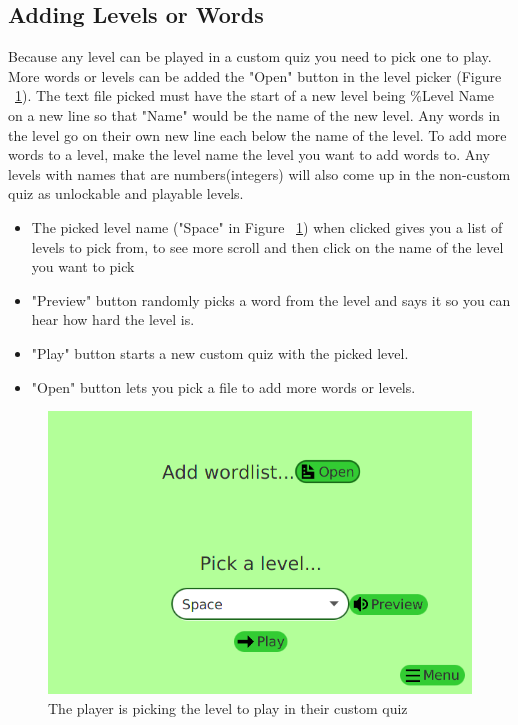 \documentclass[12pt,a4paper,titlepage,onecolumn]{article}
\begin{document}
	\subsection{Adding Levels or Words}\label{addlist}
	Because any level can be played in a custom quiz you need to pick one to play.\\ More words or levels can be added the "Open" button in the level picker (Figure ~\ref{fig:CustomLevelPicker}). The text file picked must have the start of a new level being \%Level Name on a new line so that "Name" would be the name of the new level. Any words in the level go on their own new line each below the name of the level. To add more words to a level, make the level name the level you want to add words to. Any levels with names that are numbers(integers) will also come up in the non-custom quiz as unlockable and playable levels.
	\begin{itemize}
		\item The picked level name ("Space" in Figure ~\ref{fig:CustomLevelPicker}) when clicked gives you a list of levels to pick from, to see more scroll and then click on the name of the level you want to pick
		\item "Preview" button randomly picks a word from the level and says it so you can hear how hard the level is.
		\item "Play" button starts a new custom quiz with the picked level.
		\item "Open" button lets you pick a file to add more words or levels.
	\end{itemize}
	\begin{figure}[h]
		\centering
		\includegraphics[width=1\linewidth]{Figures/CustomQuiz/CustomLevelPicker}
		\caption[Custom Level Picker]{The player is picking the level to play in their custom quiz}
		\label{fig:CustomLevelPicker}
	\end{figure}
\end{document}
